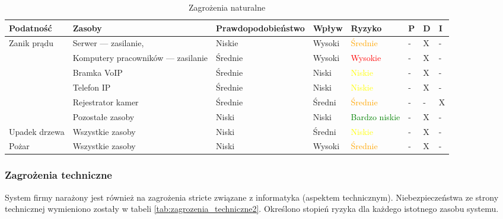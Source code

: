 \begin{landscape}
	\begin{longtable}[ht!]{|m{3cm}|m{5cm}|m{4.5cm}|m{3cm}|m{3cm}|m{0.5cm}|m{0.5cm}|m{0.5cm}|}
		\caption{Zagrożenia naturalne}
		\label{zagrożeniaN_natalne} \\
		\hline	
		\textbf{Podatność} & \textbf{Zasoby} & \textbf{Prawdopodobieństwo} & \textbf{Wpływ} &  \textbf{Ryzyko} & \textbf{P} & \textbf{D} & \textbf{I} \\ \hline
		\multirow{5}{4cm}{Zanik prądu}  
		&   Serwer --- zasilanie,  & Niskie & Wysoki & \textcolor{orange}{Średnie} & - & X & - \\ \cline{2-8}
		& Komputery pracowników --- zasilanie & Średnie & Wysoki & \textcolor{red}{Wysokie} & - & X & -  \\ \cline{2-8}
		& Bramka VoIP & Średnie & Niski & \textcolor{yellow}{Niskie} & - & X & - \\ \cline{2-8}
		& Telefon IP & Średnie & Niski & \textcolor{yellow}{Niskie} & - & X & -  \\ \cline{2-8}
		& Rejestrator kamer & Średnie & Średni & \textcolor{orange}{Średnie} & - & - & X \\ \cline{2-8}
		& Pozostałe zasoby & Niski & Niski & \textcolor{green}{Bardzo niskie} & - & X & - \\ \cline{2-8}
		\hline
		Upadek drzewa  
		& Wszystkie zasoby & Niski  & Średni & \textcolor{yellow}{Niskie} & - & X & -  \\ \cline{2-8}
		\hline
		Pożar
		& Wszystkie zasoby & Niski  & Wysoki & \textcolor{orange}{Średnie} & - & X & -  \\ \cline{2-8}
		\hline
	\end{longtable}
\end{landscape}

\subsubsection{Zagrożenia techniczne}
System firmy narażony jest również na zagrożenia stricte związane z informatyka (aspektem technicznym). Niebezpieczeństwa ze strony technicznej wymieniono zostały w tabeli  \ref{tab:zagrozenia_techniczne2}. Określono stopień ryzyka dla każdego istotnego zasobu systemu.

